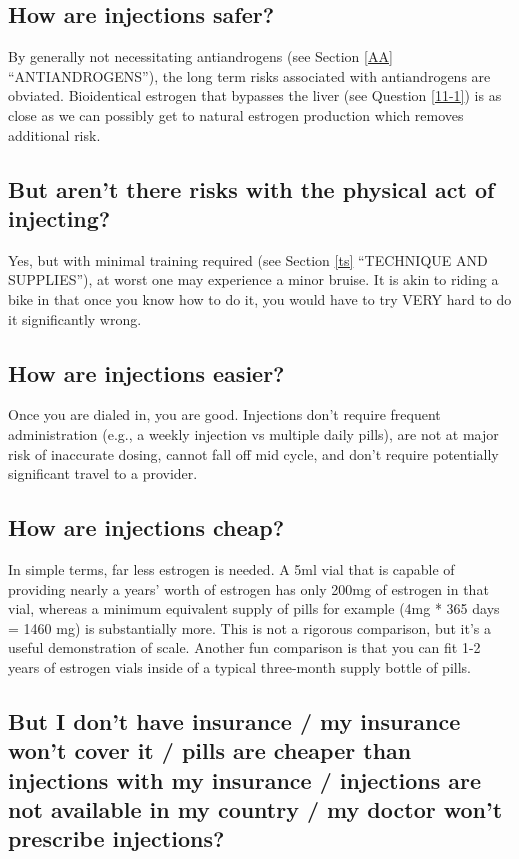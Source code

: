 \documentclass{article}
\begin{document}
\subsection{How are injections safer?}

By generally not necessitating antiandrogens (see Section \ref{AA} “ANTIANDROGENS”), the long term risks associated with antiandrogens are obviated. Bioidentical estrogen that bypasses the liver (see Question \ref{11-1}) is as close as we can possibly get to natural estrogen production which removes additional risk.

\subsection{But aren’t there risks with the physical act of injecting?}

Yes, but with minimal training required (see Section \ref{ts} “TECHNIQUE AND SUPPLIES”), at worst one may experience a minor bruise. It is akin to riding a bike in that once you know how to do it, you would have to try VERY hard to do it significantly wrong.

\subsection{How are injections easier?}

Once you are dialed in, you are good. Injections don’t require frequent administration (e.g., a weekly injection vs multiple daily pills), are not at major risk of inaccurate dosing, cannot fall off mid cycle, and don’t require potentially significant travel to a provider.

\subsection{How are injections cheap?}

In simple terms, far less estrogen is needed. A 5ml vial that is capable of providing nearly a years’ worth of estrogen has only 200mg of estrogen in that vial, whereas a minimum equivalent supply of pills for example (4mg * 365 days = 1460 mg) is substantially more. This is not a rigorous comparison, but it’s a useful demonstration of scale. Another fun comparison is that you can fit 1-2 years of estrogen vials inside of a typical three-month supply bottle of pills.

\subsection{But I don’t have insurance / my insurance won’t cover it / pills are cheaper than injections with my insurance / injections are not available in my country / my doctor won’t prescribe injections?}
\end{document}
